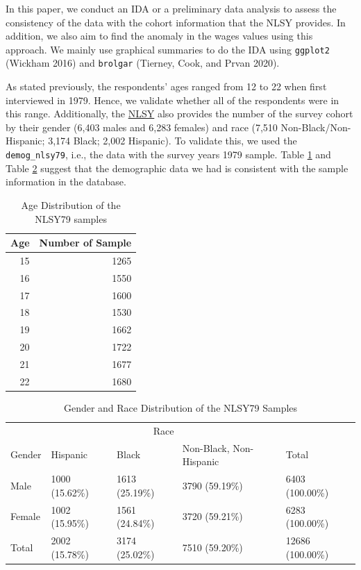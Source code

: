\documentclass{article}
\begin{document}
In this paper, we conduct an IDA or a preliminary data analysis to assess the consistency of the data with the cohort information that the NLSY provides. In addition, we also aim to find the anomaly in the wages values using this approach. We mainly use graphical summaries to do the IDA using \texttt{ggplot2} (Wickham 2016) and \texttt{brolgar} (Tierney, Cook, and Prvan 2020).

As stated previously, the respondents' ages ranged from 12 to 22 when first interviewed in 1979. Hence, we validate whether all of the respondents were in this range. Additionally, the \href{https://www.nlsinfo.org/content/cohorts/nlsy79/intro-to-the-sample/nlsy79-sample-introduction}{NLSY} also provides the number of the survey cohort by their gender (6,403 males and 6,283 females) and race (7,510 Non-Black/Non-Hispanic; 3,174 Black; 2,002 Hispanic). To validate this, we used the \texttt{demog\_nlsy79}, i.e., the data with the survey years 1979 sample. Table \ref{tab:age-table} and Table \ref{tab:gender-race-table} suggest that the demographic data we had is consistent with the sample information in the database.

\begin{table}

\caption{\label{tab:age-table}Age Distribution of the NLSY79 samples}
\centering
\begin{tabular}[t]{rr}
\toprule
Age & Number of Sample\\
\midrule
15 & 1265\\
16 & 1550\\
17 & 1600\\
18 & 1530\\
19 & 1662\\
20 & 1722\\
21 & 1677\\
22 & 1680\\
\bottomrule
\end{tabular}
\end{table}

\begin{table}

\caption{\label{tab:gender-race-table}Gender and Race Distribution of the NLSY79 Samples}
\centering
\begin{tabular}[t]{lllll}
\toprule
\multicolumn{1}{c}{ } & \multicolumn{3}{c}{Race} & \multicolumn{1}{c}{ } \\
\cmidrule(l{3pt}r{3pt}){2-4}
Gender & Hispanic & Black & Non-Black, Non-Hispanic & Total\\
\midrule
Male & 1000 (15.62\%) & 1613 (25.19\%) & 3790 (59.19\%) & 6403 (100.00\%)\\
Female & 1002 (15.95\%) & 1561 (24.84\%) & 3720 (59.21\%) & 6283 (100.00\%)\\
Total & 2002 (15.78\%) & 3174 (25.02\%) & 7510 (59.20\%) & 12686 (100.00\%)\\
\bottomrule
\end{tabular}
\end{table}
\end{document}
